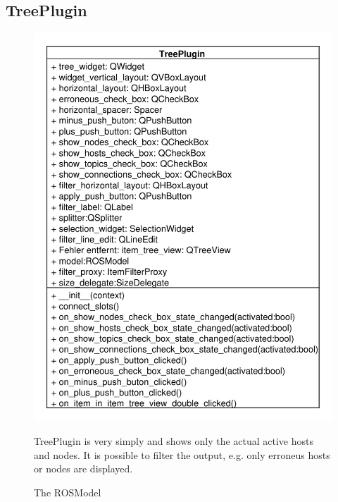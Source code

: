\subsection{TreePlugin}
\begin{figure}[htbp]
	\begin{minipage}[t]{7cm}
		\vspace{0pt}
		\centering
		\includegraphics[scale=0.6]{./diagram_pictures/Tree.pdf}
		\caption{The ROSModel}
	\end{minipage}
	\hfill
	\begin{minipage}[t]{5.5cm}
		\vspace{10pt}
		TreePlugin is very simply and shows only the actual active hosts
		and nodes. It is possible to filter the output, e.g. only erroneus hosts or
		nodes are displayed.
	\end{minipage}
\end{figure} 
